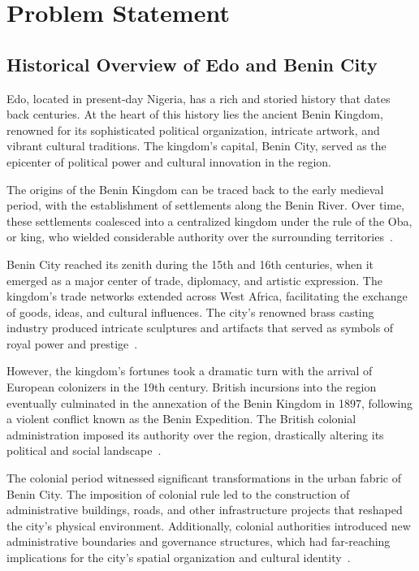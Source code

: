 \chapter{Problem Statement}

\section{Historical Overview of Edo and Benin City}
Edo, located in present-day Nigeria, has a rich and storied history that dates back centuries. At the heart of this history lies the ancient Benin Kingdom, renowned for its sophisticated political organization, intricate artwork, and vibrant cultural traditions. The kingdom's capital, Benin City, served as the epicenter of political power and cultural innovation in the region.

The origins of the Benin Kingdom can be traced back to the early medieval period, with the establishment of settlements along the Benin River. Over time, these settlements coalesced into a centralized kingdom under the rule of the Oba, or king, who wielded considerable authority over the surrounding territories~\cite{egharevba1968short}.

Benin City reached its zenith during the 15th and 16th centuries, when it emerged as a major center of trade, diplomacy, and artistic expression. The kingdom's trade networks extended across West Africa, facilitating the exchange of goods, ideas, and cultural influences. The city's renowned brass casting industry produced intricate sculptures and artifacts that served as symbols of royal power and prestige~\cite{egharevba1968short}.

However, the kingdom's fortunes took a dramatic turn with the arrival of European colonizers in the 19th century. British incursions into the region eventually culminated in the annexation of the Benin Kingdom in 1897, following a violent conflict known as the Benin Expedition. The British colonial administration imposed its authority over the region, drastically altering its political and social landscape~\cite{egharevba1968short}.

The colonial period witnessed significant transformations in the urban fabric of Benin City. The imposition of colonial rule led to the construction of administrative buildings, roads, and other infrastructure projects that reshaped the city's physical environment. Additionally, colonial authorities introduced new administrative boundaries and governance structures, which had far-reaching implications for the city's spatial organization and cultural identity~\cite{falola2006works}.

